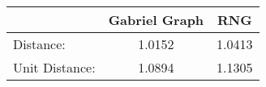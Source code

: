 \begin{tabular}{l|c|c|}
 & Gabriel Graph & RNG\\
\hline
Distance: & 1.0152 & 1.0413\\
Unit Distance: & 1.0894 & 1.1305\\
\end{tabular}